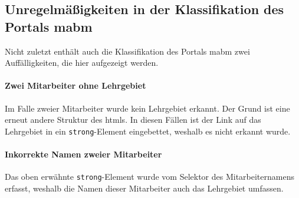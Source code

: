 \subsection{Unregelmäßigkeiten in der Klassifikation des Portals \acrshort{mabm}}
    Nicht zuletzt enthält auch die Klassifikation des Portals
    \gls{mabm}
    zwei Auffälligkeiten,
    die hier aufgezeigt werden.

    \paragraph*{Zwei Mitarbeiter ohne Lehrgebiet}
    Im Falle zweier Mitarbeiter wurde kein Lehrgebiet erkannt.
    Der Grund ist eine erneut andere Struktur des \glspl{html}.
    In diesen Fällen ist der Link auf das Lehrgebiet
    in ein \texttt{strong}-Element eingebettet, weshalb es nicht erkannt wurde.

    \paragraph*{Inkorrekte Namen zweier Mitarbeiter}
    Das oben erwähnte \texttt{strong}-Element wurde vom Selektor des Mitarbeiternamens erfasst,
    weshalb die Namen dieser Mitarbeiter auch das Lehrgebiet umfassen.
